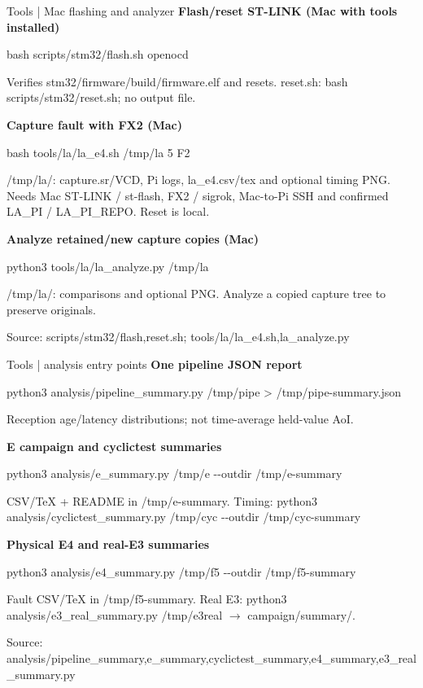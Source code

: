 \documentclass[aspectratio=169,12pt,t]{beamer}
\newcommand{\src}[1]{\par\vfill{\small\color{muted}Source: #1}}
\begin{document}
\begin{frame}{Tools | Mac flashing and analyzer}
\textbf{Flash/reset ST-LINK (Mac with tools installed)}\par{\ttfamily bash scripts/stm32/flash.sh openocd}\par Verifies stm32/firmware/build/firmware.elf and resets. reset.sh: bash scripts/stm32/reset.sh; no output file.\par\medskip
\textbf{Capture fault with FX2 (Mac)}\par{\ttfamily bash tools/la/la\_e4.sh /tmp/la 5 F2}\par /tmp/la/: capture.sr/VCD, Pi logs, la\_e4.csv/tex and optional timing PNG. Needs Mac ST-LINK / st-flash, FX2 / sigrok, Mac-to-Pi SSH and confirmed LA\_PI / LA\_PI\_REPO. Reset is local.\par\medskip
\textbf{Analyze retained/new capture copies (Mac)}\par{\ttfamily python3 tools/la/la\_analyze.py /tmp/la}\par /tmp/la/: comparisons and optional PNG. Analyze a copied capture tree to preserve originals.\par\medskip
\src{scripts/stm32/{flash,reset}.sh; tools/la/{la\_e4.sh,la\_analyze.py}}
\end{frame}
\begin{frame}{Tools | analysis entry points}
\textbf{One pipeline JSON report}\par{\ttfamily python3 analysis/pipeline\_summary.py /tmp/pipe > /tmp/pipe-summary.json}\par Reception age/latency distributions; not time-average held-value AoI.\par\medskip
\textbf{E campaign and cyclictest summaries}\par{\ttfamily python3 analysis/e\_summary.py /tmp/e -{}-outdir /tmp/e-summary}\par CSV/TeX + README in /tmp/e-summary. Timing: python3 analysis/cyclictest\_summary.py /tmp/cyc -{}-outdir /tmp/cyc-summary\par\medskip
\textbf{Physical E4 and real-E3 summaries}\par{\ttfamily python3 analysis/e4\_summary.py /tmp/f5 -{}-outdir /tmp/f5-summary}\par Fault CSV/TeX in /tmp/f5-summary. Real E3: python3 analysis/e3\_real\_summary.py /tmp/e3real $\rightarrow$ campaign/summary/.\par\medskip
\src{analysis/{pipeline\_summary,e\_summary,cyclictest\_summary,e4\_summary,e3\_real\_summary}.py}
\end{frame}
\end{document}
